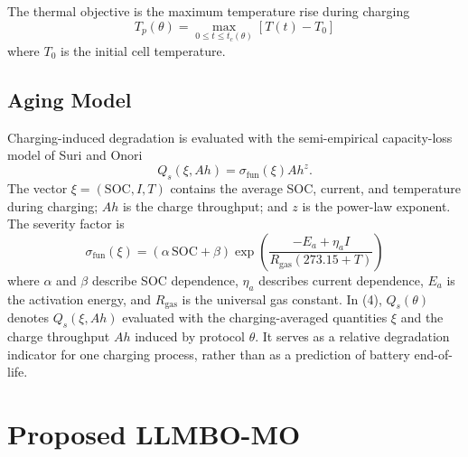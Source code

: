 \documentclass[lettersize,journal]{IEEEtran}
\begin{document}
The thermal objective is the maximum temperature rise during charging
\begin{equation}
T_p(\theta)=\max_{0\le t\le t_c(\theta)}[T(t)-T_0]
\label{eq:peak_temp}
\end{equation}
where $T_0$ is the initial cell temperature.

\subsection{Aging Model}
\label{sec:aging}

Charging-induced degradation is evaluated with the semi-empirical
capacity-loss model of Suri and Onori~\cite{refAgingModel}
\begin{equation}
Q_s(\xi,Ah)=\sigma_{\mathrm{fun}}(\xi)Ah^z.
\label{eq:aging}
\end{equation}
The vector $\xi=(\mathrm{SOC},I,T)$ contains the average SOC, current, and
temperature during charging; $Ah$ is the charge throughput; and $z$ is the
power-law exponent. The severity factor is
\begin{equation}
\sigma_{\mathrm{fun}}(\xi)=(\alpha\,\mathrm{SOC}+\beta)\exp\!\left(\frac{-E_a+\eta_a I}{R_{\mathrm{gas}}(273.15+T)}\right)
\label{eq:severity}
\end{equation}
where $\alpha$ and $\beta$ describe SOC dependence, $\eta_a$ describes current
dependence, $E_a$ is the activation energy, and $R_{\mathrm{gas}}$ is the
universal gas constant. In (4), $Q_s(\theta)$ denotes $Q_s(\xi,Ah)$
evaluated with the charging-averaged quantities $\xi$ and the charge
throughput $Ah$ induced by protocol $\theta$. It serves as a relative
degradation indicator for one charging process, rather than as a prediction
of battery end-of-life.

\section{Proposed LLMBO-MO}
\label{sec:method}
\end{document}
